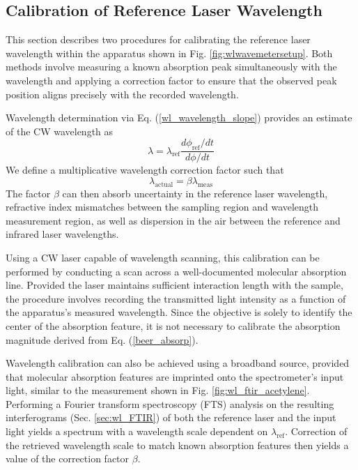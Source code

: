 \documentclass[12pt]{report}
\begin{document}
	\subsection{Calibration of Reference Laser Wavelength} \label{sec:wl_ref_calibration}
	This section describes two procedures for calibrating the reference laser wavelength within the apparatus shown in Fig. \ref{fig:wlwavemetersetup}. Both methods involve measuring a known absorption peak simultaneously with the wavelength and applying a correction factor to ensure that the observed peak position aligns precisely with the recorded wavelength.
	
	Wavelength determination via Eq. (\ref{wl_wavelength_slope}) provides an estimate of the CW wavelength as
	\begin{equation}
		\lambda = \lambda_\mathrm{ref} \frac{d\phi_\mathrm{ref} / dt}{d\phi / dt}
	\end{equation}
	We define a multiplicative wavelength correction factor such that
	\begin{equation} \label{wl_correction_factor}
		\lambda_\mathrm{actual} = \beta \lambda_\mathrm{meas}
	\end{equation}
	The factor $\beta$ can then absorb uncertainty in the reference laser wavelength, refractive index mismatches between the sampling region and wavelength measurement region, as well as dispersion in the air between the reference and infrared laser wavelengths.
	
	Using a CW laser capable of wavelength scanning, this calibration can be performed by conducting a scan across a well-documented molecular absorption line. Provided the laser maintains sufficient interaction length with the sample, the procedure involves recording the transmitted light intensity as a function of the apparatus's measured wavelength. Since the objective is solely to identify the center of the absorption feature, it is not necessary to calibrate the absorption magnitude derived from Eq. (\ref{beer_absorp}).
	
	Wavelength calibration can also be achieved using a broadband source, provided that molecular absorption features are imprinted onto the spectrometer's input light, similar to the measurement shown in Fig. \ref{fig:wl_ftir_acetylene}. Performing a Fourier transform spectroscopy (FTS) analysis on the resulting interferograms (Sec. \ref{sec:wl_FTIR}) of both the reference laser and the input light yields a spectrum with a wavelength scale dependent on $\lambda_\mathrm{ref}$. Correction of the retrieved wavelength scale to match known absorption features then yields a value of the correction factor $\beta$.
	
\end{document}
